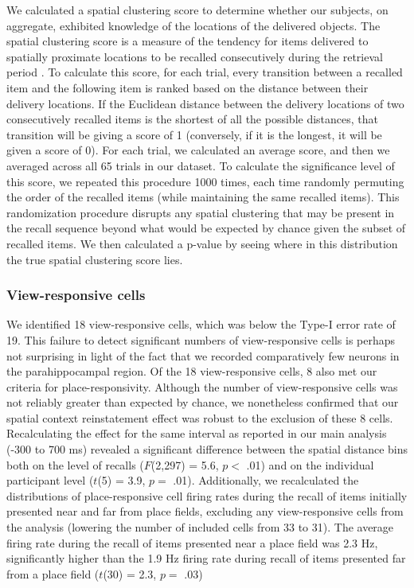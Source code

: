 We calculated a spatial clustering score to determine whether our subjects, on aggregate, exhibited knowledge of the locations of the delivered objects. The spatial clustering score is a measure of the tendency for items delivered to spatially proximate locations to be recalled consecutively during the retrieval period \cite{MillEtal12a}. To calculate this score, for each trial, every transition between a recalled item and the following item is ranked based on the distance between their delivery locations. If the Euclidean distance between the delivery locations of two consecutively recalled items is the shortest of all the possible distances, that transition will be giving a score of 1 (conversely, if it is the longest, it will be given a score of 0). For each trial, we calculated an average score, and then we averaged across all 65 trials in our dataset. To calculate the significance level of this score, we repeated this procedure 1000 times, each time randomly permuting the order of the recalled items (while maintaining the same recalled items). This randomization procedure disrupts any spatial clustering that may be present in the recall sequence beyond what would be expected by chance given the subset of recalled items. We then calculated a p-value by seeing where in this distribution the true spatial clustering score lies.

\subsubsection*{View-responsive cells}
We identified 18 view-responsive cells, which was below the Type-I error rate of 19. This failure to detect significant numbers of view-responsive cells is perhaps not surprising in light of the fact that we recorded comparatively  few neurons in the parahippocampal region.  Of the 18 view-responsive cells, 8 also met our criteria for place-responsivity.  Although the number of view-responsive cells was not reliably greater than expected by chance, we nonetheless confirmed that our spatial context reinstatement effect was robust to the exclusion of these 8 cells.  Recalculating the effect for the same interval as reported in our main analysis (-300 to 700 ms)  revealed a significant difference between the spatial distance bins both on the level of recalls ($F$(2,297) = 5.6, $p <$ .01) and on the individual participant level ($t$(5) = 3.9, $p =$ .01).  Additionally, we recalculated the distributions of place-responsive cell firing rates during the recall of items initially presented near and far from place fields, excluding any view-responsive cells from the analysis (lowering the number of included cells from 33 to 31). The average firing rate during the recall of items presented near a place field was 2.3 Hz, significantly higher than the 1.9 Hz firing rate during recall of items presented far from a place field ($t$(30) = 2.3, $p =$ .03)

